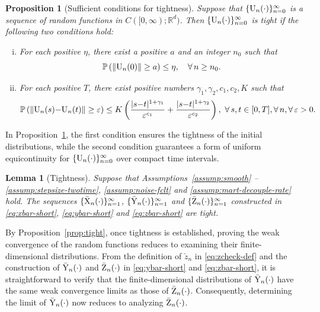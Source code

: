 \documentclass[11pt]{article}
\theoremstyle{plain}
\newtheorem{lem}{Lemma}[section]
\newtheorem{prop}{Proposition}[section]
\theoremstyle{definition}
\def\eps{{\varepsilon}}
\def\RB{{\mathbb R}}
\def\PB{{\mathbb P}}
\newcommand{\zcheck}{{\check{z}}}
\newcommand{\xbar}{{\bar{\textnormal{X}}}}
\newcommand{\ybar}{{\bar{\textnormal{Y}}}}
\newcommand{\zbar}{{\bar{\textnormal{Z}}}}
\newcommand{\uu}{{\textnormal{U}}}
\begin{document}
\begin{prop}
	[Sufficient conditions for tightness]
	\label{prop:tight-suff-slow}
	Suppose that $\{ \uu_{n}(\cdot) \}_{n=0}^\infty$ is a sequence of random functions in $C([0, \infty); \RB^{d})$.
	Then $\{ \uu_{n}(\cdot) \}_{n=0}^\infty$ is tight 
	if the following two conditions hold:
	\begin{enumerate}[(i)]
		\item For each positive $\eta$, there exist a positive $a$ and an integer $n_0$ such that 
		\begin{equation*}
			\PB \left( \| \uu_{n}(0) \| \ge a \right) \le \eta, \quad \forall\, n \ge n_0.
		\end{equation*}
		\item For each 
		positive $T$, there exist positive numbers $\gamma_1, \gamma_2, c_1, c_2, K$ such that
		\begin{equation}\label{eq:tight-suff-slow}
			\PB \left(  \| \uu_{n}(s) {-} \uu_{n}(t) \| \ge \eps  \right) \le K \left( \frac{|s{-}t |^{1 {+} \gamma_1} }{\eps^{c_1} } + \frac{ | s{-}t |^{1 {+} \gamma_2}}{\eps^{c_2}} \right), \  \forall\, s,t \in [0, T], \forall \, n,
			\forall\, \eps > 0.
		\end{equation}
	\end{enumerate}
\end{prop} 

In Proposition~\ref{prop:tight-suff-slow}, the first condition ensures the tightness of the initial distributions, while the second condition guarantees a form of uniform equicontinuity for $\{ \uu_{n} (\cdot) \}_{n=0}^\infty$ over compact time intervals.



\begin{lem}[Tightness]\label{lem:tight-twotime}
	Suppose that Assumptions~\ref{assump:smooth} -- \ref{assump:stepsize-twotime}, \ref{assump:noise-fclt} and \ref{assump:mart-decouple-rate} hold.
	The sequences $\{ \xbar_{n}(\cdot) \}_{n=1}^\infty$, $\{ \ybar_{n}(\cdot) \}_{n=1}^\infty$  
	and $\{ \zbar_{n}(\cdot) \}_{n=1}^\infty$ constructed in \eqref{eq:xbar-short}, \eqref{eq:ybar-short} and \eqref{eq:zbar-short}
	are tight.
\end{lem}

By Proposition~\ref{prop:tight}, once tightness is established, proving the weak convergence of the random functions reduces to examining their finite-dimensional distributions.
From the definition of $\zcheck_{n}$ in \eqref{eq:zcheck-def} and the construction of $\ybar_{n}(\cdot)$ and $\zbar_{n}(\cdot)$ in \eqref{eq:ybar-short} and \eqref{eq:zbar-short}, it is straightforward to verify that the finite-dimensional distributions of $\ybar_{n}(\cdot)$ have the same weak convergence limits as those of $\zbar_{n}(\cdot)$.
Consequently, determining the limit of $\ybar_{n}(\cdot)$ now reduces to analyzing $\zbar_{n}(\cdot)$.
\end{document}
